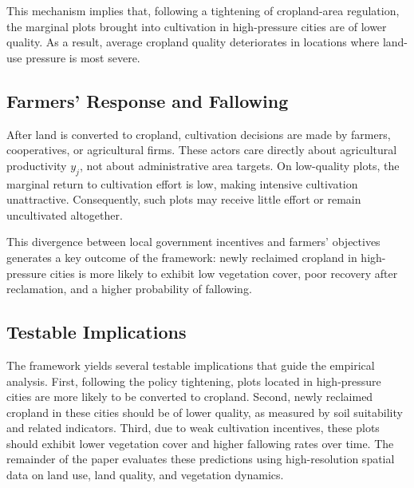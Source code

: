 This mechanism implies that, following a tightening of cropland-area regulation, the marginal plots brought into cultivation in high-pressure cities are of lower quality. As a result, average cropland quality deteriorates in locations where land-use pressure is most severe.

\subsection{Farmers' Response and Fallowing}

After land is converted to cropland, cultivation decisions are made by farmers, cooperatives, or agricultural firms. These actors care directly about agricultural productivity $y_j$, not about administrative area targets. 
On low-quality plots, the marginal return to cultivation effort is low, making intensive cultivation unattractive. 
Consequently, such plots may receive little effort or remain uncultivated altogether.

This divergence between local government incentives and farmers' objectives generates a key outcome of the framework: newly reclaimed cropland in high-pressure cities is more likely to exhibit low vegetation cover, poor recovery after reclamation, and a higher probability of fallowing. 

\subsection{Testable Implications}

The framework yields several testable implications that guide the empirical analysis. First, following the policy tightening, plots located in high-pressure cities are more likely to be converted to cropland. Second, newly reclaimed cropland in these cities should be of lower quality, as measured by soil suitability and related indicators. Third, due to weak cultivation incentives, these plots should exhibit lower vegetation cover and higher fallowing rates over time. 
The remainder of the paper evaluates these predictions using high-resolution spatial data on land use, land quality, and vegetation dynamics.
